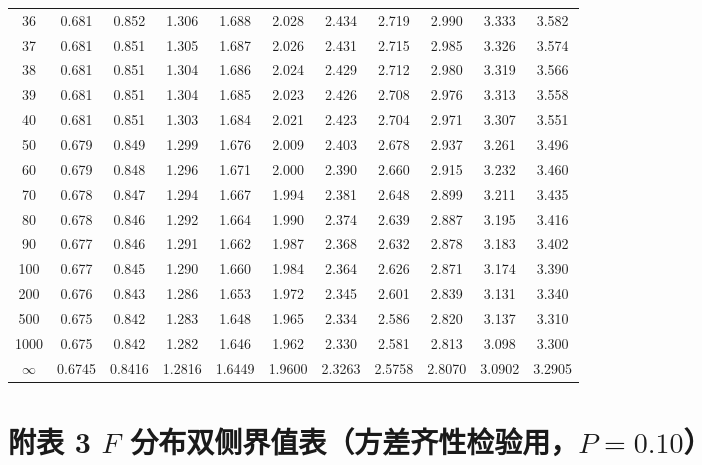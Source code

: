 \documentclass[lang=cn,10pt]{elegantbook}
\begin{document}
\begin{longtable}{c|cccccccccc}
    36 & 0.681 & 0.852 & 1.306 & 1.688 & 2.028  & 2.434  & 2.719  & 2.990   & 3.333   & 3.582 \\
    37 & 0.681 & 0.851 & 1.305 & 1.687 & 2.026  & 2.431  & 2.715  & 2.985   & 3.326   & 3.574 \\
    38 & 0.681 & 0.851 & 1.304 & 1.686 & 2.024  & 2.429  & 2.712  & 2.980   & 3.319   & 3.566 \\
    39 & 0.681 & 0.851 & 1.304 & 1.685 & 2.023  & 2.426  & 2.708  & 2.976   & 3.313   & 3.558 \\
    40 & 0.681 & 0.851 & 1.303 & 1.684 & 2.021  & 2.423  & 2.704  & 2.971   & 3.307   & 3.551 \\
    50 & 0.679 & 0.849 & 1.299 & 1.676 & 2.009  & 2.403  & 2.678  & 2.937   & 3.261   & 3.496 \\
    60 & 0.679 & 0.848 & 1.296 & 1.671 & 2.000  & 2.390  & 2.660  & 2.915   & 3.232   & 3.460 \\
    70 & 0.678 & 0.847 & 1.294 & 1.667 & 1.994  & 2.381  & 2.648  & 2.899   & 3.211   & 3.435 \\
    80 & 0.678 & 0.846 & 1.292 & 1.664 & 1.990  & 2.374  & 2.639  & 2.887   & 3.195   & 3.416 \\
    90 & 0.677 & 0.846 & 1.291 & 1.662 & 1.987  & 2.368  & 2.632  & 2.878   & 3.183   & 3.402 \\
    100& 0.677 & 0.845 & 1.290 & 1.660 & 1.984  & 2.364  & 2.626  & 2.871   & 3.174   & 3.390 \\
    200& 0.676 & 0.843 & 1.286 & 1.653 & 1.972  & 2.345  & 2.601  & 2.839   & 3.131   & 3.340 \\
    500& 0.675 & 0.842 & 1.283 & 1.648 & 1.965  & 2.334  & 2.586  & 2.820   & 3.137   & 3.310 \\
    1000&0.675 & 0.842 & 1.282 & 1.646 & 1.962  & 2.330  & 2.581  & 2.813   & 3.098   & 3.300 \\
    $\infty$&0.6745&0.8416&1.2816&1.6449&1.9600& 2.3263 & 2.5758 & 2.8070  & 3.0902  & 3.2905 \\
    \hline
\end{longtable}

\newpage

\section{附表 3 $F$ 分布双侧界值表（方差齐性检验用，$P=0.10$）}
\end{document}
